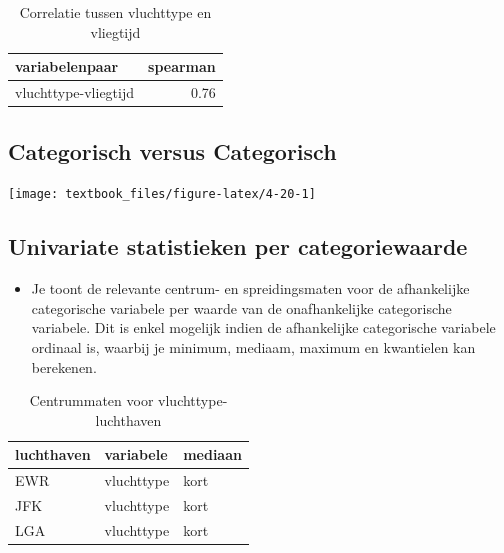 \documentclass[]{tufte-book}
\providecommand{\tightlist}{%
  \setlength{\itemsep}{0pt}\setlength{\parskip}{0pt}}
\begin{document}
\begin{table}

\caption{\label{tab:unnamed-chunk-73}Correlatie tussen vluchttype en vliegtijd}
\centering
\fontsize{10}{12}\selectfont
\begin{tabular}[t]{lr}
\toprule
variabelenpaar & spearman\\
\midrule
vluchttype-vliegtijd & 0.76\\
\bottomrule
\end{tabular}
\end{table}

\hypertarget{categorisch-versus-categorisch}{%
\subsection{Categorisch versus Categorisch}\label{categorisch-versus-categorisch}}

\texttt{[image: textbook\_files/figure-latex/4-20-1]}

\hypertarget{univariate-statistieken-per-categoriewaarde-1}{%
\subsection*{Univariate statistieken per categoriewaarde}\label{univariate-statistieken-per-categoriewaarde-1}}

\begin{itemize}
\tightlist
\item
  Je toont de relevante centrum- en spreidingsmaten voor de afhankelijke categorische variabele per waarde van de onafhankelijke categorische variabele. Dit is enkel mogelijk indien de afhankelijke categorische variabele ordinaal is, waarbij je minimum, mediaam, maximum en kwantielen kan berekenen.
\end{itemize}

\begin{table}

\caption{\label{tab:unnamed-chunk-74}Centrummaten voor vluchttype-luchthaven}
\centering
\fontsize{10}{12}\selectfont
\begin{tabular}[t]{lll}
\toprule
luchthaven & variabele & mediaan\\
\midrule
EWR & vluchttype & kort\\
JFK & vluchttype & kort\\
LGA & vluchttype & kort\\
\bottomrule
\end{tabular}
\end{table}
\end{document}
